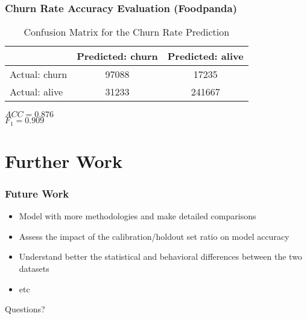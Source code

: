 \documentclass{beamer} %
\theoremstyle{definition} %
\begin{document}
\begin{frame}
\frametitle{Churn Rate Accuracy Evaluation (Foodpanda)}
\begin{center}
            \begin{table}
\begin{tabular}{l | c | c }
 & Predicted: churn & Predicted: alive\\
\hline \hline
Actual: churn & 97088 & 17235\\ 
Actual: alive & 31233 & 241667
\end{tabular}
\caption{Confusion Matrix for the Churn Rate Prediction}
\end{table}
        \end{center}     
       
\begin{rmk}
	$ACC=0.876$ \\
    $F_1=0.909$ 
\end{rmk}
\end{frame}

\section{Further Work} %
\begin{frame}
\frametitle{Future Work}
\begin{itemize}
\item Model with more methodologies and make detailed comparisons
\item Assess the impact of the calibration/holdout set ratio on model accuracy
\item Understand better the statistical and behavioral differences between the two datasets
\item etc
\end{itemize}
\end{frame}

\begin{frame}
Questions?
\end{frame}

\end{document}
